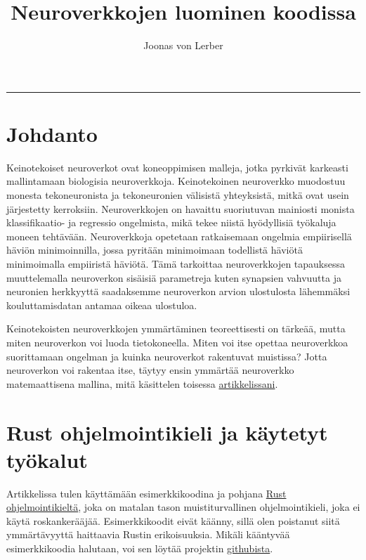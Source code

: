 \documentclass{article}
\author{Joonas von Lerber}
\title{Neuroverkkojen luominen koodissa}
\begin{document}
\maketitle

\tableofcontents

\vskip15pt
\hrule
\vskip15pt

\section{Johdanto}

Keinotekoiset neuroverkot ovat koneoppimisen malleja, jotka pyrkivät karkeasti mallintamaan biologisia neuroverkkoja.
Keinotekoinen neuroverkko muodostuu monesta tekoneuronista ja tekoneuronien välisistä yhteyksistä, mitkä ovat usein
järjestetty kerroksiin. Neuroverkkojen on havaittu suoriutuvan mainiosti monista klassifikaatio- ja regressio ongelmista,
mikä tekee niistä hyödyllisiä työkaluja moneen tehtävään. Neuroverkkoja opetetaan ratkaisemaan ongelmia empiirisellä
häviön minimoinnilla\cite{vapnik1999nature}, jossa pyritään minimoimaan todellistä häviötä minimoimalla empiiristä häviötä.
Tämä tarkoittaa neuroverkkojen tapauksessa muuttelemalla neuroverkon sisäisiä parametreja kuten synapsien vahvuutta ja neuronien
herkkyyttä saadaksemme neuroverkon arvion ulostulosta lähemmäksi kouluttamisdatan antamaa oikeaa ulostuloa.

Keinotekoisten neuroverkkojen ymmärtäminen teoreettisesti on tärkeää, mutta miten neuroverkon voi luoda tietokoneella.
Miten voi itse opettaa neuroverkkoa suorittamaan ongelman ja kuinka neuroverkot rakentuvat muistissa? %
Jotta neuroverkon voi rakentaa itse, täytyy ensin ymmärtää neuroverkko matemaattisena mallina, mitä käsittelen toisessa \href{http://example.com}{artikkelissani}. %

\section{Rust ohjelmointikieli ja käytetyt työkalut}

Artikkelissa tulen käyttämään esimerkkikoodina ja pohjana \href{https://www.rust-lang.org/}{Rust ohjelmointikieltä}, joka on matalan tason muistiturvallinen ohjelmointikieli, joka ei käytä roskankerääjää.%
Esimerkkikoodit eivät käänny, sillä olen poistanut siitä ymmärtävyyttä haittaavia Rustin erikoisuuksia. Mikäli kääntyvää esimerkkikoodia halutaan,
voi sen löytää projektin \href{https://github.com/Joonas-vonlerber/rusticneurons}{githubista}.
\end{document}
